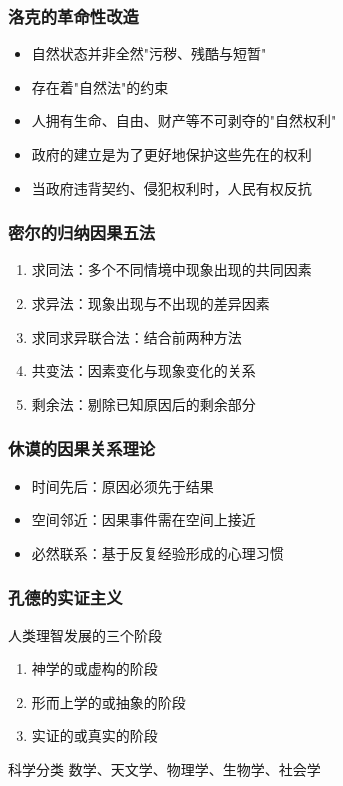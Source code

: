 \documentclass{beamer}
\begin{document}
\begin{frame}
\frametitle{洛克的革命性改造}
\begin{itemize}
\item 自然状态并非全然"污秽、残酷与短暂"
\item 存在着"自然法"的约束
\item 人拥有生命、自由、财产等不可剥夺的"自然权利"
\item 政府的建立是为了更好地保护这些先在的权利
\item 当政府违背契约、侵犯权利时，人民有权反抗
\end{itemize}
\end{frame}

\begin{frame}
\frametitle{密尔的归纳因果五法}
\begin{enumerate}
\item 求同法：多个不同情境中现象出现的共同因素
\item 求异法：现象出现与不出现的差异因素
\item 求同求异联合法：结合前两种方法
\item 共变法：因素变化与现象变化的关系
\item 剩余法：剔除已知原因后的剩余部分
\end{enumerate}
\end{frame}

\begin{frame}
\frametitle{休谟的因果关系理论}
\begin{itemize}
\item 时间先后：原因必须先于结果
\item 空间邻近：因果事件需在空间上接近
\item 必然联系：基于反复经验形成的心理习惯
\end{itemize}
\end{frame}

\begin{frame}
\frametitle{孔德的实证主义}
\begin{block}{人类理智发展的三个阶段}
\begin{enumerate}
\item 神学的或虚构的阶段
\item 形而上学的或抽象的阶段
\item 实证的或真实的阶段
\end{enumerate}
\end{block}

\begin{block}{科学分类}
数学、天文学、物理学、生物学、社会学
\end{block}
\end{frame}
\end{document}
